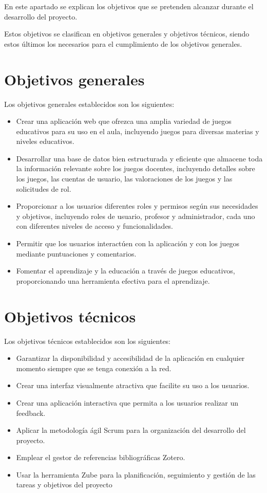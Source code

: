 
En este apartado se explican los objetivos que se pretenden alcanzar durante el desarrollo del proyecto.

Estos objetivos se clasifican en objetivos generales y objetivos técnicos, siendo estos últimos los necesarios para el cumplimiento de los objetivos generales.

\section {Objetivos generales}
Los objetivos generales establecidos son los siguientes:
\begin{itemize}
    \item Crear una aplicación web que ofrezca una amplia variedad de juegos educativos para su uso en el aula, incluyendo juegos para diversas materias y niveles educativos.
    \item Desarrollar una base de datos bien estructurada y eficiente que almacene toda la información relevante sobre los juegos docentes, incluyendo detalles sobre los juegos, las cuentas de usuario, las valoraciones de los juegos y las solicitudes de rol.
    \item Proporcionar a los usuarios diferentes roles y permisos según sus necesidades y objetivos, incluyendo roles de usuario, profesor y administrador, cada uno con diferentes niveles de acceso y funcionalidades.
    \item Permitir que los usuarios interactúen con la aplicación y con los juegos mediante puntuaciones y comentarios.
    \item Fomentar el aprendizaje y la educación a través de juegos educativos, proporcionando una herramienta efectiva para el aprendizaje.
\end{itemize}

\section {Objetivos técnicos}
Los objetivos técnicos establecidos son los siguientes:
\begin{itemize}
    \item Garantizar la disponibilidad y accesibilidad de la aplicación en cualquier momento siempre que se tenga conexión a la red.
    \item Crear una interfaz visualmente atractiva que facilite su uso a los usuarios.
    \item Crear una aplicación interactiva que permita a los usuarios realizar un feedback.
    \item Aplicar la metodología ágil Scrum para la organización del desarrollo del proyecto.
    \item Emplear el gestor de referencias bibliográficas Zotero.
    \item Usar la herramienta Zube para la planificación, seguimiento y gestión de las tareas y objetivos del proyecto
\end{itemize}
	
